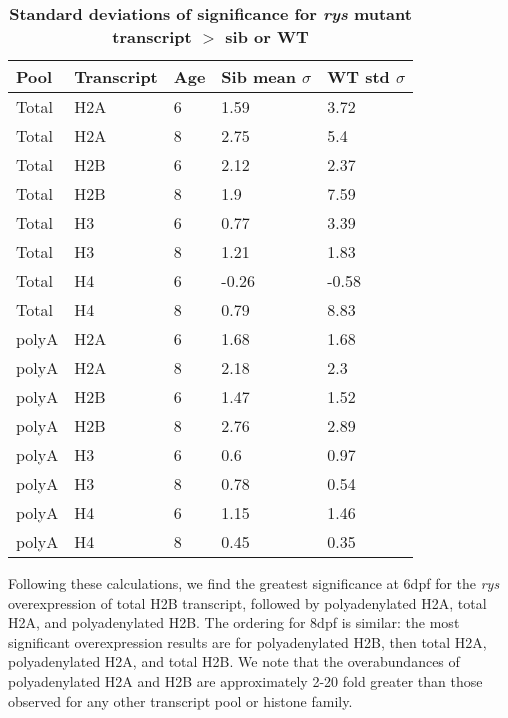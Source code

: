 \begin{table}[!ht]
    \centering
    \caption{{\bf Standard deviations of significance for \textit{rys} mutant transcript $>$ sib or WT}}
    \begin{tabular}{|l|l|l|l|l|} 
        \hline {\bf Pool} & {\bf Transcript} & {\bf Age} & {\bf Sib mean $\sigma$} & {\bf WT std $\sigma$}\\ \hline 
        Total & H2A & 6 & 1.59 & 3.72\\ \hline
        Total & H2A & 8 & 2.75 & 5.4\\ \hline
        Total & H2B & 6 & 2.12 & 2.37\\ \hline
        Total & H2B & 8 & 1.9 & 7.59\\ \hline
        Total & H3 & 6 & 0.77 & 3.39\\ \hline
        Total & H3 & 8 & 1.21 & 1.83\\ \hline
        Total & H4 & 6 & -0.26 & -0.58\\ \hline
        Total & H4 & 8 & 0.79 & 8.83\\ \hline
        polyA & H2A & 6 & 1.68 & 1.68\\ \hline
        polyA & H2A & 8 & 2.18 & 2.3\\ \hline
        polyA & H2B & 6 & 1.47 & 1.52\\ \hline
        polyA & H2B & 8 & 2.76 & 2.89\\ \hline
        polyA & H3 & 6 & 0.6 & 0.97\\ \hline
        polyA & H3 & 8 & 0.78 & 0.54\\ \hline
        polyA & H4 & 6 & 1.15 & 1.46\\ \hline
        polyA & H4 & 8 & 0.45 & 0.35\\ \hline
    \end{tabular}
    \label{qPCRstds}
\end{table}

Following these calculations, we find the greatest significance at 6dpf for the \textit{rys} overexpression of total H2B transcript, followed by polyadenylated H2A, total H2A, and polyadenylated H2B. The ordering for 8dpf is similar: the most significant overexpression results are for polyadenylated H2B, then total H2A, polyadenylated H2A, and total H2B. We note that the overabundances of polyadenylated H2A and H2B are approximately 2-20 fold greater than those observed for any other transcript pool or histone family. 

